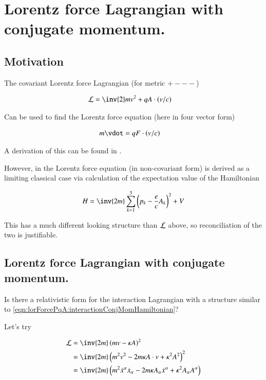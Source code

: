 \chapter{Lorentz force Lagrangian with conjugate momentum.}
\label{chap:lorentzForcePQA}
\date{ April 15, 2009.  $RCSfile: lorentzForcePQA.tex,v $ Last $Revision: 1.9 $ $Date: 2009/10/22 02:07:20 $ }

\section{Motivation }

The covariant Lorentz force Lagrangian (for metric $+---$)

\begin{align}
\LL &= \inv{2} m v^2 + q A \cdot (v/c)
\end{align}

Can be used to find the Lorentz force equation (here in four vector form)

\begin{align}
m\vdot &= q F \cdot (v/c)
\end{align}

A derivation of this can be found in .

However, in
\cite{pauli2000wm} the Lorentz force equation (in non-covariant form) is
derived as a limiting classical case via calculation of the expectation
value of the Hamiltonian

\begin{align}\label{eqn:lorForcePqA:interactionConjMomHamiltonian}
H = \inv{2m}\sum_{k=1}^3 \left(p_k - \frac{e}{c} A_k \right)^2 + V
\end{align}

This has a much different looking structure than $\mathcal{L}$ above, so reconciliation of the two
is justifiable.

\section{Lorentz force Lagrangian with conjugate momentum. }

Is there a relativistic form for the interaction Lagrangian with a structure similar to \ref{eqn:lorForcePqA:interactionConjMomHamiltonian}?

Let's try

\begin{align*}
\LL
&= \inv{2 m}\left( m v - \kappa A \right)^2 \\
&= \inv{2 m}\left( m^2 v^2 - 2 m \kappa A \cdot v + \kappa^2 A^2 \right)^2 \\
&= \inv{2 m} \left(
m^2 \xdot^\alpha \xdot_\alpha
- 2 m \kappa A_\alpha \xdot^\alpha
+ \kappa^2 A_\alpha A^\alpha
\right) \\
\end{align*}

